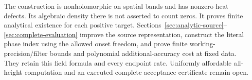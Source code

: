 The construction is nonholomorphic on spatial bands and has nonzero heat
defects. Its algebraic density there is not asserted to count zeros.
It proves finite analytical existence for each positive target.
Sections~\ref{sec:analytic-source}--\ref{sec:complete-evaluation} improve
the source representation, construct the literal phase index using the
allowed onset freedom, and prove finite working-precision/filter bounds
and polynomial additional-accuracy cost at fixed data. They retain this
field formula and every endpoint rate. Uniformly affordable all-height
computation and an executed complete acceptance certificate remain open.
